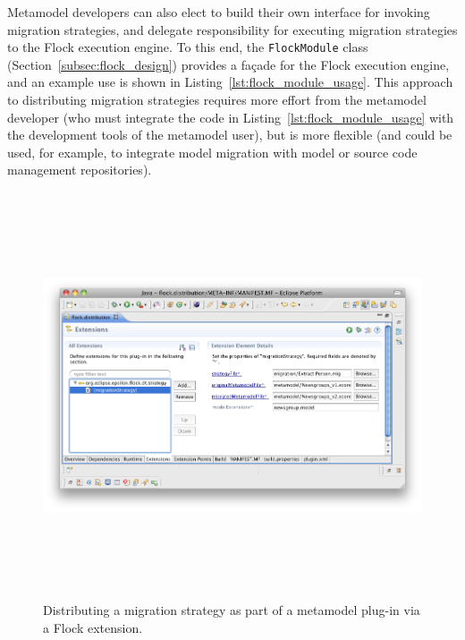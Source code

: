 Metamodel developers can also elect to build their own interface for invoking migration strategies, and delegate responsibility for executing migration strategies to the Flock execution engine. To this end, the \texttt{FlockModule} class (Section~\ref{subsec:flock_design}) provides a fa\c{c}ade \cite[pg185]{gamma95patterns} for the Flock execution engine, and an example use is shown in Listing~\ref{lst:flock_module_usage}. This approach to distributing migration strategies requires more effort from the metamodel developer (who must integrate the code in Listing~\ref{lst:flock_module_usage} with the development tools of the metamodel user), but is more flexible (and could be used, for example, to integrate model migration with model or source code management repositories).

\begin{landscape}
\begin{figure}[tbp]
	\centering
		\includegraphics[height=12cm]{5.Implementation/images/flock_programmers_guide/extension.png}
	\caption{Distributing a migration strategy as part of a metamodel plug-in via a Flock extension.}
	\label{fig:flock_extension}
\end{figure}
\end{landscape}

